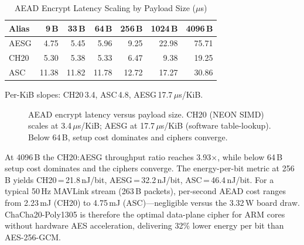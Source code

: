 \begin{table}[t]
\centering
\caption{AEAD Encrypt Latency Scaling by Payload Size ($\mu$s)}
\label{tab:aead_scaling}
\footnotesize
\begin{tabular}{@{}lrrrrrr@{}}
\toprule
\textbf{Alias} &
  \textbf{9\,B} & \textbf{33\,B} & \textbf{64\,B} &
  \textbf{256\,B} & \textbf{1024\,B} & \textbf{4096\,B} \\
\midrule
AESG & 4.75  & 5.45  & 5.96  & 9.25  & 22.98 & 75.71 \\
CH20 & 5.30  & 5.38  & 5.33  & 6.47  & 9.38  & 19.25 \\
ASC  & 11.38 & 11.82 & 11.78 & 12.72 & 17.27 & 30.86 \\
\bottomrule
\end{tabular}
\begin{tablenotes}
\footnotesize
\item Per-KiB slopes: CH20\,3.4, ASC\,4.8, AESG\,17.7\,$\mu$s/KiB.
\end{tablenotes}
\end{table}

\begin{figure}[t]
\centering
{}
\caption{AEAD encrypt latency versus payload size.  CH20 (NEON SIMD)
  scales at 3.4\,$\mu$s/KiB; AESG at 17.7\,$\mu$s/KiB (software
  table-lookup).  Below 64\,B, setup cost dominates and ciphers
  converge.}
\label{fig:aead_scaling}
\end{figure}

At 4096\,B the CH20:AESG throughput ratio reaches 3.93$\times$,
while below 64\,B setup cost dominates and the ciphers converge.
The energy-per-bit metric at 256\,B yields
CH20\,=\,21.8\,nJ/bit, AESG\,=\,32.2\,nJ/bit,
ASC\,=\,46.4\,nJ/bit.  For a typical 50\,Hz MAVLink stream
(263\,B packets), per-second AEAD cost ranges from 2.23\,mJ (CH20)
to 4.75\,mJ (ASC)---negligible versus the 3.32\,W board draw.
ChaCha20-Poly1305 is therefore the optimal data-plane cipher for
ARM cores without hardware AES acceleration, delivering 32\% lower
energy per bit than AES-256-GCM.


